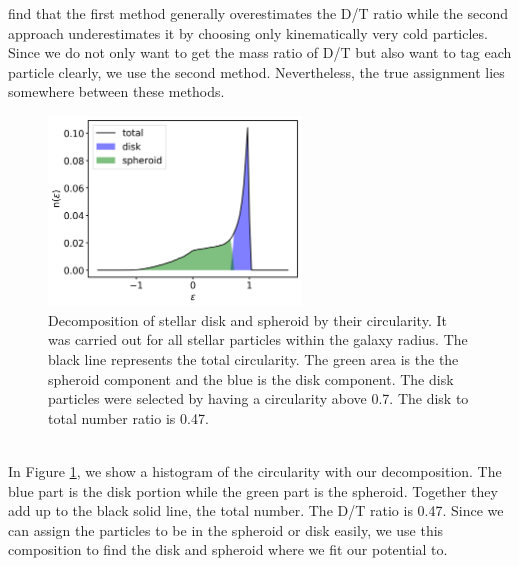 \cite{AurigaGrand} find that the first method generally overestimates the \ac{D/T} ratio while the second approach underestimates it by choosing only kinematically very cold particles. Since we do not only want to get the mass ratio of \ac{D/T} but also want to tag each particle clearly, we use the second method. Nevertheless, the true assignment lies somewhere between these methods. 
\begin{figure}%
\captionsetup{format=plain}
    \centering
    \includegraphics[width=0.6\textwidth]{plots/Auriga/decomposition_snap_127.png}
\caption{Decomposition of stellar disk and spheroid by their circularity. It was carried out for all stellar particles within the galaxy radius. The black line represents the total circularity. The green area is the the spheroid component and the blue is the disk component. The disk particles were selected by having a circularity above 0.7. The disk to total number ratio is 0.47.}\label{fig:decomposition}
\end{figure}
\\In Figure \ref{fig:decomposition}, we show a histogram of the circularity with our decomposition. The blue part is the disk portion while the green part is the spheroid. Together they add up to the black solid line, the total number. The \ac{D/T} ratio is 0.47.
Since we can assign the particles to be in the spheroid or disk easily, we use this composition to find the disk and spheroid where we fit our potential to. 


